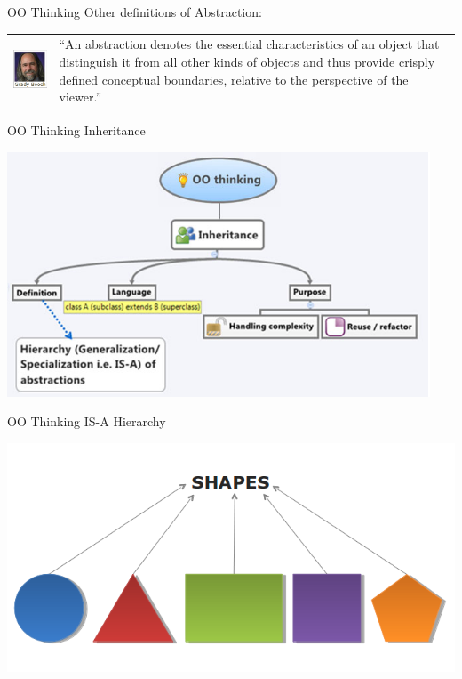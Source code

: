 \documentclass[14pt]{beamer}
\begin{document}
\begin{frame}{OO Thinking}
Other definitions of Abstraction:
\begin{tabular}{l l}
\begin{minipage}{0.25\textwidth}
\includegraphics[scale=.6]{Image13.png}
\end{minipage}
&
\begin{minipage}{0.65\textwidth}
``An abstraction denotes the essential characteristics of an object that distinguish it from all other kinds of objects and thus provide crisply defined conceptual boundaries, relative to the perspective of the viewer.''
\end{minipage}
\end{tabular}
\end{frame}
\begin{frame}{OO Thinking}
Inheritance
\begin{center}
    \includegraphics[scale=0.5]{Image14.png}
\end{center}
\end{frame}
\begin{frame}{OO Thinking}
IS-A Hierarchy
\begin{center}
    \includegraphics[scale=0.5]{Image15.png}
\end{center}
\end{frame}
\end{document}
